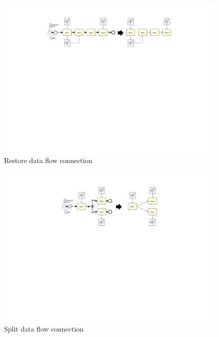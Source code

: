 \begin{figure}[h!]
	\centering
	\includegraphics[width=\textwidth, trim={7.5cm 15cm 7cm 0cm}]{img/ExtractDFDRestore.pdf}
	\caption{Restore data flow connection}
	\label{fig:restoreDataFlow}
\end{figure}

\begin{figure}[h!]
	\includegraphics[width=\textwidth, trim={8.5cm 13.2cm 8.5cm 2.4cm}]{img/ExtractDFDGateWaySplit.pdf}
	\caption{Split data flow connection}
	\label{fig:splitDataFlow}
\end{figure}

